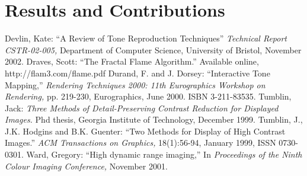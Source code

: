 \documentclass[letterpaper, 12pt]{article}
\begin{document}
\section{Results and Contributions}

\begin{thebibliography}{77}
 Devlin, Kate: ``A Review of Tone Reproduction Techniques'' {\it Technical Report CSTR-02-005,} Department of Computer Science, University of Bristol, November 2002.
 Draves, Scott: ``The Fractal Flame Algorithm.'' Available online, http://flam3.com/flame.pdf
 Durand, F. and J. Dorsey: ``Interactive Tone Mapping,'' {\it Rendering Techniques 2000: 11th Eurographics Workshop on Rendering,} pp. 219-230, Eurographics, June 2000. ISBN 3-211-83535.
 Tumblin, Jack: {\it Three Methods of Detail-Preserving Contrast Reduction for Displayed Images.} Phd thesis, Georgia Institute of Technology, December 1999.
 Tumblin, J., J.K. Hodgins and B.K. Guenter: ``Two Methods for Display of High Contrast Images.'' {\it ACM Transactions on Graphics,} 18(1):56-94, January 1999, ISSN 0730-0301.
 Ward, Gregory: ``High dynamic range imaging,'' In {\it Proceedings of the Ninth Colour Imaging Conference,} November 2001.
\end{thebibliography}
\end{document}
